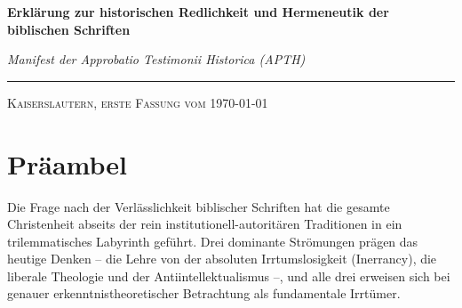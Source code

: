 \documentclass[11pt,a4paper]{article}
\newcommand{\apth}{{\apthfont APTH}\hspace{0.15em}\xspace}
\begin{document}
\begin{center}
    \thispagestyle{plain} %
    {\huge\bfseries Erklärung zur historischen Redlichkeit und Hermeneutik der biblischen Schriften\par}
    \vspace{0.4cm}
    {\Large\itshape Manifest der Approbatio Testimonii Historica (\apth)\par}
    \vspace{0.3cm}
    {\rule{0.5\textwidth}{0.4pt}\par}
    \vspace{0.2cm}
    {\large\scshape Kaiserslautern, erste Fassung vom \today \par}
\end{center}

\vspace{0.4cm}

\section*{Präambel}

Die Frage nach der Verlässlichkeit biblischer Schriften hat die gesamte Christenheit abseits der rein institutionell-autoritären Traditionen in ein trilemmatisches Labyrinth geführt. Drei dominante Strömungen prägen das heutige Denken – die Lehre von der absoluten Irrtumslosigkeit (Inerrancy), die liberale Theologie und der Antiintellektualismus –, und alle drei erweisen sich bei genauer erkenntnistheoretischer Betrachtung als fundamentale Irrtümer.
\end{document}
